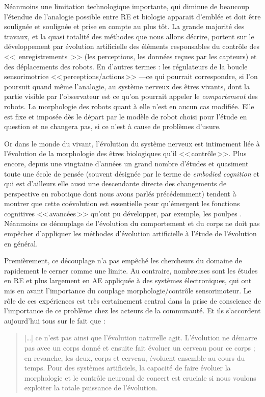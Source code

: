 Néanmoins une limitation technologique importante, qui diminue de beaucoup l'étendue de l'analogie possible entre RE et biologie apparait d'emblée et doit être soulignée et soulignée et  prise en compte au plus tôt. La grande majorité des travaux, et la quasi totalité des méthodes que nous allons décrire, portent sur le développement par évolution artificielle des éléments responsables du contrôle des <<~enregistrements~>> (les perceptions, les données reçues par les capteurs) et des déplacements des robots. En d'autres termes : les régulateurs de la boucle sensorimotrice <<\,perceptions/actions\,>> ---ce qui pourrait correspondre, si l'on poursuit quand même l'analogie, au système nerveux des êtres vivants, dont la partie visible par l'observateur est ce qu'on pourrait appeler le \emph{comportement} des robots. La morphologie des robots quant à elle n'est en aucun cas modifiée. Elle est fixe et imposée dès le départ par le modèle de robot choisi pour l'étude en question et ne changera pas, si ce n'est à cause de problèmes d'usure.

Or dans le monde du vivant, l'évolution du système nerveux est intimement liée à l'évolution de la morphologie des êtres biologiques qu'il <<\,contrôle\,>>. Plus encore, depuis une vingtaine d'années un grand nombre d'études et quasiment toute une école de pensée (souvent désignée par le terme de \emph{embodied cognition} et qui est d'ailleurs elle aussi une descendante directe des changements de perspective en robotique dont nous avons parlés précédemment) tendent à montrer que cette coévolution est essentielle pour qu'émergent les fonctions cognitives <<\,avancées\,>> qu'ont pu développer, par exemple, les poulpes \citep{pfeifer2006howthebodyshapesthewaywethink}. Néanmoins ce découplage de l'évolution du comportement et du corps ne doit pas empêcher d'appliquer les méthodes d'évolution artificielle à l'étude de l'évolution en général.

Premièrement, ce découplage n'a pas empêché les chercheurs du domaine de rapidement le cerner comme une limite. Au contraire, nombreuses sont les études en RE et plus largement en AE appliquée à des systèmes électroniques, qui ont mis en avant l'importance du couplage morphologie/contrôle sensorimoteur. Le rôle de ces expériences est très certainement central dans la prise de conscience de l'importance de ce problème chez les acteurs de la communauté. Et ils s'accordent aujourd'hui tous sur le fait que :
\begin{quote}
	[\ldots] ce n'est pas ainsi que l'évolution naturelle agit. L'évolution ne démarre pas avec un corps donné et ensuite fait évoluer un cerveau pour ce corps ; en revanche, les deux, corps et cerveau, évoluent ensemble au cours du temps. Pour des systèmes artificiels, la capacité de faire évoluer la morphologie et le contrôle neuronal de concert est cruciale si nous voulons exploiter la totale puissance de l'évolution.
   \\\citep[p. 193]{pfeifer2006howthebodyshapesthewaywethink}
\end{quote}

